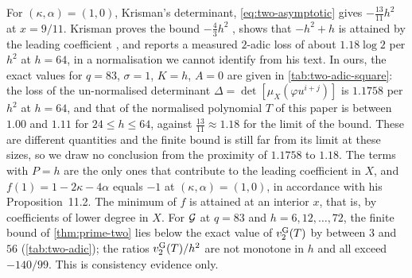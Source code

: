 \begin{remark}\label{rem:two-comparison}
For $(\kappa,\alpha)=(1,0)$, Krisman's determinant, \eqref{eq:two-asymptotic} gives
$-\frac{13}{11}h^2$ at $x=9/11$. Krisman proves the bound $-\frac43h^2$
\cite[Lemma~11.1]{Krisman2026chi2}, shows that $-h^2+h$ is attained by the leading coefficient
\cite[Prop.~11.2]{Krisman2026chi2}, and reports a measured $2$-adic loss of about $1.18\log2$ per $h^2$ at $h=64$, in a
normalisation we cannot identify from his text. In ours, the exact values for $q=83$,
$\sigma=1$, $K=h$, $A=0$ are given in \cref{tab:two-adic-square}: the loss of the un-normalised
determinant $\Delta=\det[\mu_X(\varphi u^{i+j})]$ is $1.1758$ per $h^2$ at $h=64$, and that of
the normalised polynomial $T$ of this paper is between $1.00$ and $1.11$ for $24\le h\le64$,
against $\frac{13}{11}\approx1.18$ for the limit of the bound. These are different quantities
and the finite bound is still far from its limit at these sizes, so we draw no conclusion from the
proximity of $1.1758$ to $1.18$. The terms with $P=h$ are the only ones that contribute to the
leading coefficient in $X$, and $f(1)=1-2\kappa-4\alpha$ equals $-1$ at $(\kappa,\alpha)=(1,0)$,
in accordance with his Proposition~11.2. The minimum
of $f$ is attained at an interior $x$, that is, by coefficients of lower degree in $X$. For
$\mathcal{G}$ at $q=83$ and $h=6,12,\dots,72$, the finite bound of \cref{thm:prime-two} lies below the
exact value of $v_{2}^{\mathrm{G}}(T)$ by between $3$ and $56$ (\cref{tab:two-adic}); the ratios
$v_{2}^{\mathrm{G}}(T)/h^2$ are not monotone in $h$ and all exceed $-140/99$. This is consistency evidence
only.
\end{remark}
